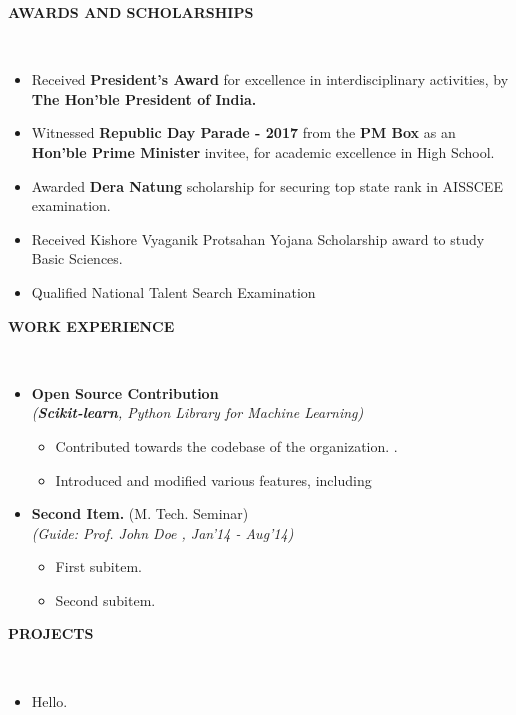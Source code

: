 \documentclass[a4paper,10pt]{article}
\newcommand{\isep}{-2 pt}
\newcommand{\lsep}{-0.5cm}
\newcommand{\resheading}[1]{{\small \colorbox{mygrey}{\begin{minipage}{0.975\textwidth}{\textbf{#1 \vphantom{p\^{E}}}}\end{minipage}}}}
\begin{document}
\resheading{\textbf{AWARDS AND SCHOLARSHIPS} }\\[\lsep]
\begin{itemize}
\setlength\itemsep{0.05em}
\item \noindent Received \textbf{President's Award} for excellence in interdisciplinary activities, by \textbf{The Hon'ble President of India.}
\item \noindent Witnessed \textbf{Republic Day Parade - 2017} from the \textbf{PM Box} as an \textbf{Hon'ble Prime Minister} invitee, for academic excellence in High School.
\item \noindent Awarded \textbf{Dera Natung }scholarship for securing top state rank in AISSCEE examination.
\item \noindent Received Kishore Vyaganik Protsahan Yojana Scholarship award to study Basic Sciences.
\item \noindent Qualified National Talent Search Examination 
\end{itemize}

\resheading{\textbf{WORK EXPERIENCE} }\\[\lsep]
\begin{itemize}
\item \textbf{Open Source Contribution
}  \\
 \emph{(\textbf{Scikit-learn}, Python Library for Machine Learning)} \\[-0.6cm]
	\begin{itemize}\itemsep \isep
	\item Contributed towards the codebase of the organization.
.
	\item Introduced and modified various features, including 

	\end{itemize}

\item \textbf{Second Item.
} (M. Tech. Seminar) \\
 \emph{(Guide: Prof. John Doe
, Jan'14 - Aug'14)} \\[-0.6cm]
	\begin{itemize}\itemsep \isep
	\item First subitem.
	\item Second subitem.
	\end{itemize}
\end{itemize}

\resheading{\textbf{PROJECTS} }\\[\lsep]
\begin{itemize}
\item \noindent Hello.
\end{itemize}
\end{document}
